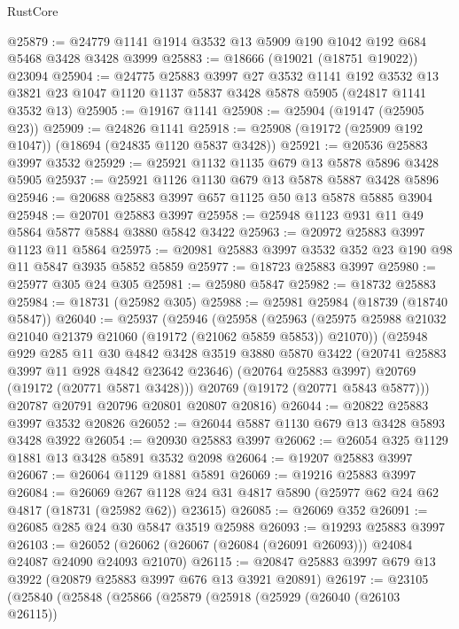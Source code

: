 \begin{lexlean}{RustCore}
\begin{coremodule}
@25879 := @24779 @1141 @1914 @3532 @13 @5909 @190 @1042 @192 @684 @5468 @3428 @3428 @3999
@25883 := @18666 (@19021 (@18751 @19022)) @23094
@25904 := @24775
    @25883
    @3997
    @27
    @3532
    @1141
    @192
    @3532
    @13
    @3821
    @23
    @1047
    @1120
    @1137
    @5837
    @3428
    @5878
    @5905
    (@24817 @1141 @3532 @13)
@25905 := @19167 @1141
@25908 := @25904 (@19147 (@25905 @23))
@25909 := @24826 @1141
@25918 := @25908 (@19172 (@25909 @192 @1047)) (@18694 (@24835 @1120 @5837 @3428))
@25921 := @20536 @25883 @3997 @3532
@25929 := @25921 @1132 @1135 @679 @13 @5878 @5896 @3428 @5905
@25937 := @25921 @1126 @1130 @679 @13 @5878 @5887 @3428 @5896
@25946 := @20688 @25883 @3997 @657 @1125 @50 @13 @5878 @5885 @3904
@25948 := @20701 @25883 @3997
@25958 := @25948 @1123 @931 @11 @49 @5864 @5877 @5884 @3880 @5842 @3422
@25963 := @20972 @25883 @3997 @1123 @11 @5864
@25975 := @20981 @25883 @3997 @3532 @352 @23 @190 @98 @11 @5847 @3935 @5852 @5859
@25977 := @18723 @25883 @3997
@25980 := @25977 @305 @24 @305
@25981 := @25980 @5847
@25982 := @18732 @25883
@25984 := @18731 (@25982 @305)
@25988 := @25981 @25984 (@18739 (@18740 @5847))
@26040 := @25937
    (@25946
      (@25958
        (@25963 (@25975 @25988 @21032 @21040 @21379 @21060 (@19172 (@21062 @5859 @5853)) @21070))
        (@25948
          @929
          @285
          @11
          @30
          @4842
          @3428
          @3519
          @3880
          @5870
          @3422
          (@20741 @25883 @3997 @11 @928 @4842 @23642 @23646)
          (@20764 @25883 @3997)
          @20769
          (@19172 (@20771 @5871 @3428)))
        @20769
        (@19172 (@20771 @5843 @5877)))
      @20787
      @20791
      @20796
      @20801
      @20807
      @20816)
@26044 := @20822 @25883 @3997 @3532 @20826
@26052 := @26044 @5887 @1130 @679 @13 @3428 @5893 @3428 @3922
@26054 := @20930 @25883 @3997
@26062 := @26054 @325 @1129 @1881 @13 @3428 @5891 @3532 @2098
@26064 := @19207 @25883 @3997
@26067 := @26064 @1129 @1881 @5891
@26069 := @19216 @25883 @3997
@26084 := @26069
    @267
    @1128
    @24
    @31
    @4817
    @5890
    (@25977 @62 @24 @62 @4817 (@18731 (@25982 @62)) @23615)
@26085 := @26069 @352
@26091 := @26085 @285 @24 @30 @5847 @3519 @25988
@26093 := @19293 @25883 @3997
@26103 := @26052 (@26062 (@26067 (@26084 (@26091 @26093))) @24084 @24087 @24090 @24093 @21070)
@26115 := @20847 @25883 @3997 @679 @13 @3922 (@20879 @25883 @3997 @676 @13 @3921 @20891)
@26197 := @23105
    (@25840
      (@25848
        (@25866
          (@25879
            (@25918
              (@25929
                (@26040 (@26103 @26115))

\end{coremodule}
\end{lexlean}
